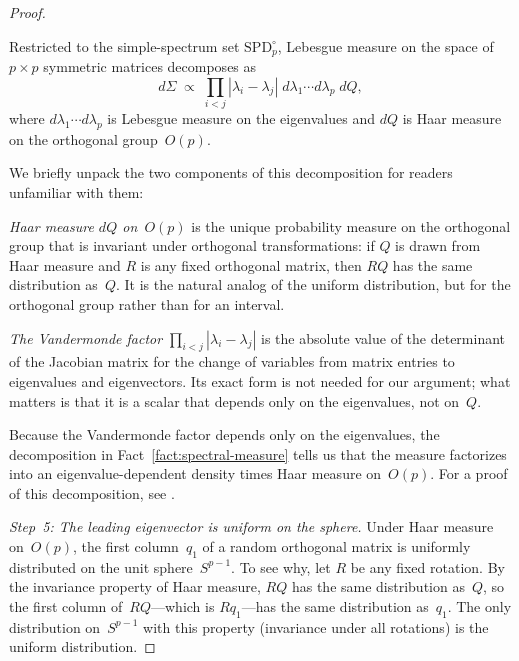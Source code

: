 \documentclass[hidelinks]{siamart251216}
\begin{document}
\begin{proof}
  \begin{fact}\label{fact:spectral-measure}
    Restricted to the simple-spectrum set $\mathrm{SPD}_p^\circ$,
    Lebesgue measure on the space of $p \times p$ symmetric matrices
    decomposes as
    \[
      d\Sigma \;\propto\;
      \prod_{i < j} |\lambda_i - \lambda_j|\;
      d\lambda_1 \cdots d\lambda_p \; dQ,
    \]
    where $d\lambda_1 \cdots d\lambda_p$ is Lebesgue measure on the
    eigenvalues and $dQ$ is Haar measure on the orthogonal
    group~$O(p)$.
  \end{fact}

  We briefly unpack the two components of this decomposition for
  readers unfamiliar with them:

  \emph{Haar measure $dQ$ on~$O(p)$} is the unique probability measure
  on the orthogonal group that is invariant under orthogonal
  transformations: if $Q$ is drawn from Haar measure and $R$ is any
  fixed orthogonal matrix, then $RQ$ has the same distribution
  as~$Q$.  It is the natural analog of the uniform distribution, but
  for the orthogonal group rather than for an interval.

  \emph{The Vandermonde factor} $\prod_{i<j}|\lambda_i - \lambda_j|$
  is the absolute value of the determinant of the Jacobian matrix for
  the change of variables from matrix entries to eigenvalues and
  eigenvectors.  Its exact form is not needed for our argument; what
  matters is that it is a scalar that depends only on the eigenvalues,
  not on~$Q$.

  Because the Vandermonde factor depends only on the eigenvalues, the
  decomposition in Fact~\ref{fact:spectral-measure} tells us that the
  measure factorizes into an eigenvalue-dependent density times Haar
  measure on~$O(p)$.  For a proof of this decomposition, see
  \cite[Theorem~2.6.1]{AndersonGuionnetZeitouni2010}.

  \emph{Step~5: The leading eigenvector is uniform on the sphere.}
  Under Haar measure on~$O(p)$, the first column~$q_1$ of a random
  orthogonal matrix is uniformly distributed on the unit
  sphere~$S^{p-1}$.  To see why, let $R$ be any fixed rotation.  By
  the invariance property of Haar measure, $RQ$ has the same
  distribution as~$Q$, so the first column of~$RQ$---which is
  $Rq_1$---has the same distribution as~$q_1$.  The only distribution
  on~$S^{p-1}$ with this property (invariance under all rotations) is
  the uniform distribution.


\end{proof}
\end{document}
